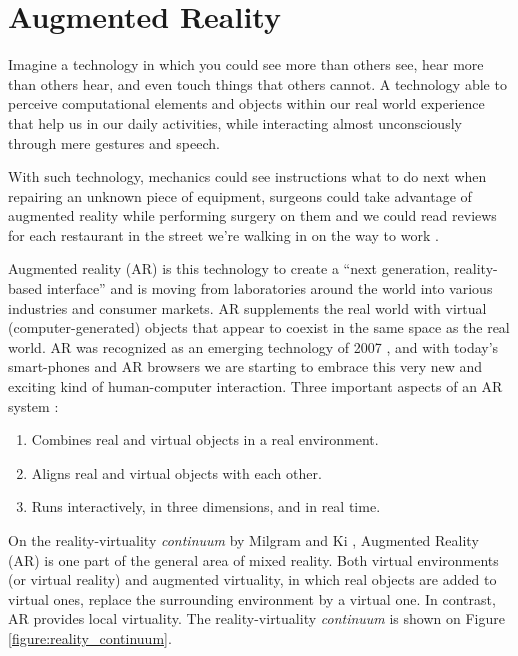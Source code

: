 
\section{Augmented Reality} %
\label{sec:basic_concepts:augmented_reality}

Imagine a technology in which you could see more than others see, hear more than others hear, and even touch things that others cannot. A technology able to perceive computational elements and objects within our real world experience that help us in our daily activities, while interacting almost unconsciously through mere gestures and speech.

With such technology, mechanics could see instructions what to do next when repairing an unknown piece of equipment, surgeons could take advantage of augmented reality while performing surgery on them and we could read reviews for each restaurant in the street we're walking in on the way to work \cite{Krevelen2010}.

Augmented reality (AR) is this technology to create a ``next generation, reality-based interface'' \cite{Krevelen2010} and is moving from laboratories around the world into various industries and consumer markets. AR supplements the real world with virtual (computer-generated) objects that appear to coexist in the same space as the real world. AR was recognized as an emerging technology of 2007 \cite{Krevelen2010}, and with today's smart-phones and AR browsers we are starting to embrace this very new and exciting kind of human-computer interaction. Three important aspects of an AR system \cite{Benford1998}:

\begin{enumerate}
  \item Combines real and virtual objects in a real environment.
  \item Aligns real and virtual objects with each other.
  \item Runs interactively, in three dimensions, and in real time.
\end{enumerate}

On the reality-virtuality \textit{continuum} by Milgram and Ki \cite{Mistry2009}, Augmented Reality (AR) is one part of the general area of mixed reality. Both virtual environments (or virtual reality) and augmented virtuality, in which real objects are added to virtual ones, replace the surrounding environment by a virtual one. In contrast, AR provides local virtuality. The reality-virtuality \textit{continuum} is shown on Figure \ref{figure:reality_continuum}.

